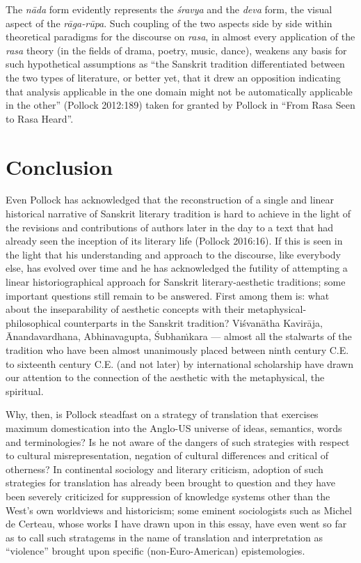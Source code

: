 The \textsl{nāda} form evidently represents the \textsl{śravya} and the \textsl{deva} form, the visual aspect of the \textsl{rāga-rūpa}. Such coupling of the two aspects side by side within theoretical paradigms for the discourse on \textsl{rasa}, in almost every application of the \textsl{rasa} theory (in the fields of drama, poetry, music, dance), weakens any basis for such hypothetical assumptions as “the Sanskrit tradition differentiated between the two types of literature, or better yet, that it drew an opposition indicating that analysis applicable in the one domain might not be automatically applicable in the other” (Pollock 2012:189) taken for granted by Pollock in “From Rasa Seen to Rasa Heard”.

\section*{Conclusion}

Even Pollock has acknowledged that the reconstruction of a single and linear historical narrative of Sanskrit literary tradition is hard to achieve in the light of the revisions and contributions of authors later in the day to a text that had already seen the inception of its literary life (Pollock 2016:16). If this is seen in the light that his understanding and approach to the discourse, like everybody else, has evolved over time and he has acknowledged the futility of attempting a linear historiographical approach for Sanskrit literary-aesthetic traditions; some important questions still remain to be answered. First among them is: what about the inseparability of aesthetic concepts with their metaphysical-philosophical counterparts in the Sanskrit tradition? Viśvanātha Kavirāja, Ānandavardhana, Abhinavagupta, Śubhaṁkara --- almost all the stalwarts of the tradition who have been almost unanimously placed between ninth century C.E. to sixteenth century C.E. (and not later) by international scholarship have drawn our attention to the connection of the aesthetic with the metaphysical, the spiritual. 

Why, then, is Pollock steadfast on a strategy of translation that exercises maximum domestication into the Anglo-US universe of ideas, semantics, words and terminologies? Is he not aware of the dangers of such strategies with respect to cultural misrepresentation, negation of cultural differences and critical of otherness? In continental sociology and literary criticism, adoption of such strategies for translation has already been brought to question and they have been severely criticized for suppression of knowledge systems other than the West’s own worldviews and historicism; some eminent sociologists such as Michel de Certeau, whose works I have drawn upon in this essay, have even went so far as to call such stratagems in the name of translation and interpretation as “violence” brought upon specific (non-Euro-American) epistemologies. 

